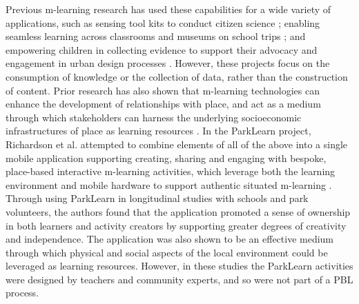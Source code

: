 \documentclass[,hyphens]{sigchi}
\begin{document}
Previous m-learning research has used these capabilities for a wide variety of applications, such as sensing tool kits to conduct citizen science \cite{Sharples2017}; enabling seamless learning across classrooms and museums on school trips \cite{Vavoula2009}; and empowering children in collecting evidence to support their advocacy and engagement in urban design processes \cite{Peacock2018}. However, these projects focus on the consumption of knowledge or the collection of data, rather than the construction of content. Prior research has also shown that m-learning technologies can enhance the development of relationships with place, and act as a medium through which stakeholders can harness the underlying socioeconomic infrastructures of place as learning resources \cite{Richardson2017}. In the ParkLearn project, Richardson et al. attempted to combine elements of all of the above into a single mobile application supporting creating, sharing and engaging with bespoke, place-based interactive m-learning activities, which leverage both the learning environment and mobile hardware to support authentic situated m-learning \cite{Richardson2018}. Through using ParkLearn in longitudinal studies with schools and park volunteers, the authors found that the application promoted a sense of ownership in both learners and activity creators by supporting greater degrees of creativity and independence. The application was also shown to be an effective medium through which physical and social aspects of the local environment could be leveraged as learning resources. However, in these studies the ParkLearn activities were designed by teachers and community experts, and so were not part of a PBL process.
\end{document}
